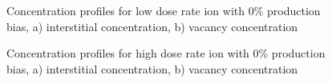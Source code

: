 \documentclass[a4paper]{article}
\begin{document}
\begin{figure}[h!]
        \caption{Concentration profiles for low dose rate ion with 0\% production bias, a) interstitial concentration, b) vacancy concentration}
        \label{figure:concentrations_ion_0_1e-6}
      \end{figure}
      \begin{figure}[h!]  %
        \centering
        \qquad
        \caption{Concentration profiles for high dose rate ion with 0\% production bias, a) interstitial concentration, b) vacancy concentration}
        \label{figure:concentrations_ion_0_1e-3}
      \end{figure}
\end{document}
